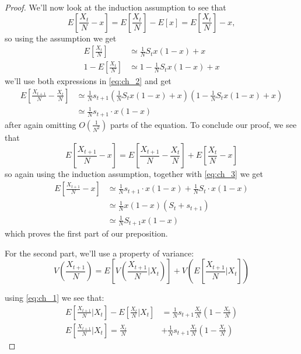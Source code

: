 \documentclass[12pt]{extarticle}
\begin{document}
\begin{proof}
We'll now look at the induction assumption to see that
\begin{equation}
E\left[\frac{X_t}{N}-x\right]=E\left[\frac{X_t}{N}\right]-E[x]=E\left[\frac{X_t}{N}\right]-x ,
\end{equation}
so using the assumption we get
\begin{equation}
\begin{split}
E\left[\frac{X_t}{N}\right] &\simeq \frac{1}{N} S_t x(1-x)+x \\
1 - E\left[\frac{X_t}{N}\right] &\simeq 1- \frac{1}{N} S_t x(1-x)+x
\end{split}
\end{equation}
we'll use both expressions in \cref{eq:ch_2} and get
\begin{equation}\label{eq:ch_3}
\begin{split}
E\left[\frac{X_{t+1}}{N}-\frac{X_t}{N}\right] &\simeq \frac{1}{N}s_{t+1} \left(\frac{1}{N} S_t x(1-x)+x \right)\left(1- \frac{1}{N} S_t x(1-x)+x \right) \\
&\simeq  \frac{1}{N}s_{t+1}\cdot x(1-x)
\end{split}
\end{equation}
after again omitting $O(\frac{1}{N^2})$ parts of the equation.
To conclude our proof, we see that
\begin{equation}
E\left[\frac{X_{t+1}}{N}-x\right] = E\left[\frac{X_{t+1}}{N}-\frac{X_t}{N}\right] + E\left[\frac{X_t}{N}-x\right]
\end{equation}
so again using the induction assumption, together with \cref{eq:ch_3} we get
\begin{equation}
\begin{split}
E\left[\frac{X_{t+1}}{N}-x\right] &\simeq \frac{1}{N}s_{t+1}\cdot x(1-x) + \frac{1}{N}S_t\cdot x(1-x) \\
& \simeq \frac{1}{N}x(1-x)(S_t + s_{t+1}) \\
& \simeq \frac{1}{N} S_{t+1} x(1-x)
\end{split}
\end{equation}
which proves the first part of our preposition.

For the second part, we'll use a property of variance:
\begin{equation}\label{eq:ch_var}
V\left(\frac{X_{t+1}}{N}\right) = E\left[V\left(\frac{X_{t+1}}{N} \bigg|X_t \right)\right] + V\left(E\left[\frac{X_{t+1}}{N} \bigg|X_t \right]\right)
\end{equation}

using \cref{eq:ch_1} we see that:
\begin{equation}\label{eq:ch_var1}
\begin{split}
E\left[\frac{X_{t+1}}{N} \bigg|X_t \right] - E\left[\frac{X_{t}}{N} \bigg|X_t \right] &= \frac{1}{N}s_{t+1}\frac{X_t}{N}\left(1-\frac{X_t}{N} \right) \\
E\left[\frac{X_{t+1}}{N} \bigg|X_t \right] = \frac{X_t}{N} &+ \frac{1}{N}s_{t+1}\frac{X_t}{N}\left(1-\frac{X_t}{N} \right)
\end{split}
\end{equation}


\end{proof}
\end{document}
